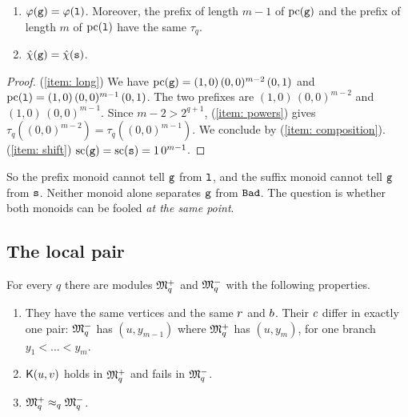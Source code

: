 \begin{lemma}\label{lemma: branch identities}
  \leavevmode
  \begin{enumerate}
    \item\label{item: long} $\varphi(\mathtt{g}) = \varphi(\mathtt{l})$.
          Moreover, the prefix of length $m-1$ of $\mathrm{pc}(\mathtt{g})$ and the prefix of length $m$ of $\mathrm{pc}(\mathtt{l})$ have the same $\tau_q$.
    \item\label{item: shift} $\hat\chi(\mathtt{g}) = \hat\chi(\mathtt{s})$.
  \end{enumerate}
\end{lemma}
\begin{proof}
  (\ref{item: long})
  We have $\mathrm{pc}(\mathtt{g}) = (1,0)\,(0,0)^{m-2}\,(0,1)$ and $\mathrm{pc}(\mathtt{l}) = (1,0)\,(0,0)^{m-1}\,(0,1)$.
  The two prefixes are $(1,0)\,(0,0)^{m-2}$ and $(1,0)\,(0,0)^{m-1}$.
  Since $m - 2 > 2^{q+1}$, (\ref{item: powers}) gives $\tau_q((0,0)^{m-2}) = \tau_q((0,0)^{m-1})$.
  We conclude by (\ref{item: composition}).
  (\ref{item: shift}) $\mathrm{sc}(\mathtt{g}) = \mathrm{sc}(\mathtt{s}) = 1\,0^{m-1}$.
\end{proof}

So the prefix monoid cannot tell $\mathtt{g}$ from $\mathtt{l}$, and the suffix monoid cannot tell $\mathtt{g}$ from $\mathtt{s}$.
Neither monoid alone separates $\mathtt{g}$ from $\mathtt{Bad}$.
The question is whether both monoids can be fooled \emph{at the same point}.

\subsection{The local pair}

\begin{proposition}\label{proposition: local pair}
  For every $q$ there are modules $\mathfrak{M}^{+}_{q}$ and $\mathfrak{M}^{-}_{q}$ with the following properties.
  \begin{enumerate}
    \item They have the same vertices and the same $r$ and $b$.
          Their $c$ differ in exactly one pair: $\mathfrak{M}^{-}_q$ has $(u, y_{m-1})$ where $\mathfrak{M}^{+}_q$ has $(u, y_m)$, for one branch $y_1 < \dots < y_m$.
    \item $\mathsf{K}(u, v)$ holds in $\mathfrak{M}^{+}_q$ and fails in $\mathfrak{M}^{-}_q$.
    \item $\mathfrak{M}^{+}_q \approx_{q} \mathfrak{M}^{-}_q$.
  \end{enumerate}
\end{proposition}

